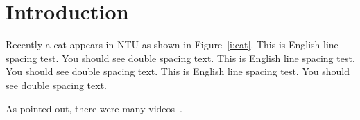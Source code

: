 \chapter{Introduction}
\label{c:intro}

Recently a cat appears in NTU as shown in Figure~\ref{i:cat}.
This is English line spacing test. You should see double spacing text.
This is English line spacing test. You should see double spacing text.
This is English line spacing test. You should see double spacing text.



As \cite{o2014cats} pointed out, there were many videos~\citep{o2014cats}.
